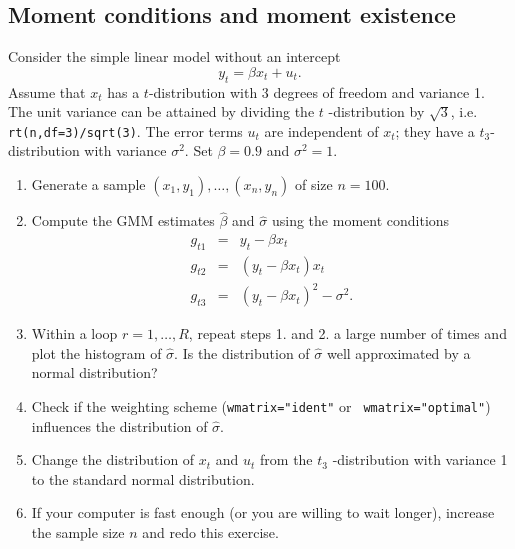 \documentclass{article}
\begin{document}
\subsection{Moment conditions and moment existence}

Consider the simple linear model without an intercept%
\begin{equation*}
y_{t}=\beta x_{t}+u_{t}.
\end{equation*}%
Assume that $x_{t}$ has a $t$-distribution with 3 degrees of freedom and
variance 1. The unit variance can be attained by dividing the $t$%
-distribution by $\sqrt{3}$, i.e. \texttt{rt(n,df=3)/sqrt(3)}. The error
terms $u_{t}$ are independent of $x_{t}$; they have a $t_{3}$-distribution
with variance $\sigma ^{2}$. Set $\beta =0.9$ and $\sigma ^{2}=1$.

\begin{enumerate}
\item Generate a sample $\left( x_{1},y_{1}\right) ,\ldots ,\left(
x_{n},y_{n}\right) $ of size $n=100$.

\item Compute the GMM estimates $\hat{\beta}$ and $\hat{\sigma}$ using the
moment conditions%
\begin{eqnarray*}
g_{t1} &=&y_{t}-\beta x_{t} \\
g_{t2} &=&\left( y_{t}-\beta x_{t}\right) x_{t} \\
g_{t3} &=&\left( y_{t}-\beta x_{t}\right) ^{2}-\sigma ^{2}.
\end{eqnarray*}

\item Within a loop $r=1,\ldots ,R$, repeat steps 1. and 2. a large number
of times and plot the histogram of $\hat{\sigma}$. Is the distribution of $%
\hat{\sigma}$ well approximated by a normal distribution?

\item Check if the weighting scheme (\texttt{wmatrix="{}ident"} or \texttt{%
wmatrix="{}optimal"}) influences the distribution of $\hat{\sigma}$.

\item Change the distribution of $x_{t}$ and $u_{t}$ from the $t_{3}$%
-distribution with variance 1 to the standard normal distribution.

\item If your computer is fast enough (or you are willing to wait longer),
increase the sample size $n$ and redo this exercise.
\end{enumerate}
\end{document}
